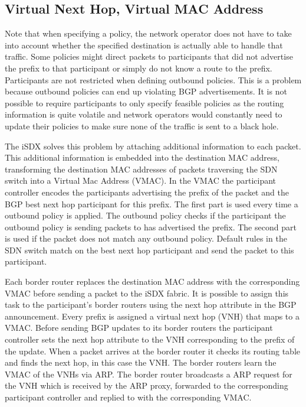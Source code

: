 \subsection{\label{chapter2:iSDX:VNH_VMAC}Virtual Next Hop, Virtual MAC Address}


Note that when specifying a policy, the network operator does not have to take into account whether the specified destination  is actually able to handle that traffic. Some policies might direct packets to participants that did not advertise the prefix to that participant or simply do not know a route to the prefix. Participants are not restricted when defining outbound policies. This is a problem because outbound policies can end up violating BGP advertisements. It is not possible to require participants to only specify feasible policies as the routing information is quite volatile and network operators would constantly need to update their policies to make sure none of the traffic is sent to a black hole. 

The iSDX solves this problem by attaching additional information to each packet. This additional information is embedded into the destination MAC address, transforming the destination MAC addresses of packets traversing the SDN switch into a Virtual Mac Address (VMAC).
In the VMAC the participant controller encodes the participants advertising the prefix of the packet and the BGP best next hop participant for this prefix. The first part is used every time a outbound policy is applied. The outbound policy checks if the participant the outbound policy is sending packets to has advertised the prefix. The second part is used if the packet does not match any outbound policy. Default rules in the SDN switch match on the best next hop participant and send the packet to this participant.

Each border router replaces the destination MAC address with the corresponding VMAC before sending a packet to the iSDX fabric. It is possible to assign this task to the participant's border routers using the next hop attribute in the BGP announcement. Every prefix is assigned a virtual next hop (VNH) that maps to a VMAC. Before sending BGP updates to its border routers the participant controller sets the next hop attribute to the VNH corresponding to the prefix of the update.  When a packet arrives at the border router it checks its routing table and finds the next hop, in this case the VNH. The border routers learn the VMAC of the VNHs via ARP. The border router broadcasts a ARP request for the VNH which is received by the ARP proxy, forwarded to the corresponding participant controller and replied to with the corresponding VMAC.

